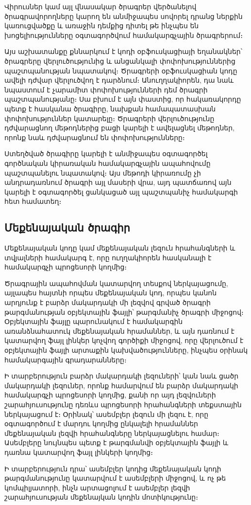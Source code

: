 \documentclass[12pt]{article}
\begin{document}
\begin{sloppypar}
Վիրուսներ կամ այլ վնասակար ծրագրեր վերծանելով ծրագրավորողները կարող են
անմիջապես սովորել դրանց ներքին կառուցվածքը և առաջին դեմքից դիտել թե
ինչպես են խոցելիությունները օգտագործվում համակարգչային ծրագրերում։

Այս աշխատանքը քննարկում է կոդի օբֆուսկացիայի եղանակներ՝ ծրագրերը
վերլուծությունից և անցանկալի փոփոխություններից պաշտպանության նպատակով։
Ծրագրերի օբֆուսկացիան կոդը ավելի դժվար վերլուծվող է դարձնում։
Անուղղակիորեն, դա նաև նպաստում է չարամիտ փոփոխությունների դեմ ծրագրի
պաշտպանությանը։ Սա բխում է այն փաստից, որ հակառակորդը պետք է
հասկանա ծրագիրը, նախքան համապատասխան փոփոխություններ կատարելը։ 
Ծրագրերի վերլուծությունը դժվարացնող մեթոդներից բացի կարելի է ավելացնել
մեթոդներ, որոնք նաև դժվարացնում են փոփոխությունները։

Ստեղծված ծրագիրը կարելի է անմիջապես օգտագործել գործնական կիրառական
համակարգչային ապահովումը պաշտպանելու նպատակով։ Այս մեթոդի կիրառումը
չի անդրադառնում ծրագրի այլ մասերի վրա, այդ պատճառով այն կարելի է
օգտագործել ցանկացած այլ պաշտպանիչ համակարգի հետ համատեղ։

\subsection{Մեքենայական ծրագիր}
Մեքենայական կոդը կամ մեքենայական լեզուն հրահանգների և տվյալների համակարգ է,
որը ուղղակիորեն հասկանալի է համակարգչի պրոցեսորի կողմից։

Ծրագրային ապահովման կատարվող տեսքով ներկայացումը, այլապես հայտնի որպես
մեքենայական կոդ, որպես կանոն արդյունք է բարձր մակարդակի մի
լեզվով գրված ծրագրի թարգմանության օբյեկտային ֆայլի՝ թարգմանիչ ծրագրի միջոցով։
Օբյեկտային ֆայլը պարունակում է համակարգին առանձնահատուկ մեքենայական հրամաններ,
և այն դառնում է կատարվող ֆայլ լինկեր կոչվող գործիքի միջոցով, որը վերլուծում է
օբյեկտային ֆայլի արտաքին կախվածությունները, ինչպես օրինակ համակարգային
գրադարանները։

Ի տարբերություն բարձր մակարդակի լեզուների՝ կան նաև ցածր մակարդակի լեզուներ,
որոնք համարվում են բարձր մակարդակի համակարգչի պրոցեսորի կողմից,
քանի որ այդ լեզվուների շարահյուսությունը դեռևս պրոցեսորի հրահանգների տեքստային
ներկայացում է։ Օրինակ՝ ասեմբլեր լեզուն մի լեզու է, որը օգտագործում է
մարդու կողմից ընկալելի հրամաններ մեքենայական լեզվի հրահանգները ներկայացնելու
համար։ Ասեմբլերը նույնպես պետք է թարգմանվի օբյեկտային ֆայլի և դառնա կատարվող
ֆայլ լինկերի կողմից։

Ի տարբերություն դրա՝ ասեմբլեր կոդից մեքենայական կոդի թարգմանությունը կատարվում
է ասեմբլերի միջոցով, և ոչ թե կոմպիլյատորի, ինչն արտացոլում է ասեմբլեր լեզվի
շարահյուսության մեքենայկան կոդին մոտիկությունը։


\end{sloppypar}
\end{document}
